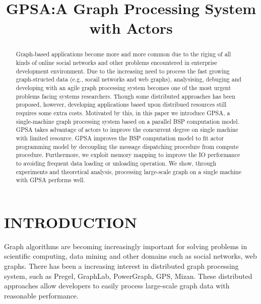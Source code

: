 \documentclass[twocolumn,a4paper,10pt]{article}
\title{GPSA:A Graph Processing System with Actors}
\author{}
\begin{document}
\maketitle
\begin{abstract}
Graph-based applications become more and more common due to the riging of all kinds of online social networks and other problems encountered in enterprise development environment. Due to the increasing need to process the fast growing graph-structed data (e.g., socail networks and web graphs), analysising, debuging and developing with an agile graph processing system becomes one of the most urgent problems facing systems researchers. Though some distributed approaches has been proposed, however, developing applications based upon distribued resources still requires some extra costs. Motivated by this, in this paper we introduce GPSA, a single-machine graph processing system based on a parallel BSP computation model. GPSA takes advantage of actors to improve the concurrent degree on single machine with limited resource. GPSA improves the BSP computation model to fit actor programming model by decoupling the message dispatching procedure from compute procedure. Furthermore, we exploit memory mapping to improve the IO performance to avoiding frequent data loading or unloading operation. We show, through experiments and theoretical analysis, processing large-scale graph on a single machine with GPSA performs well.	
\end{abstract}

\section{INTRODUCTION}
Graph algorithms are becoming increasingly important for solving problems in scientific computing, data mining and other domains such as social networks, web graphs. There has been a increasing interest in distributed graph processing system, such as Pregel, GraphLab, PowerGraph, GPS, Mizan. These distributed approaches allow developers to easily process large-scale graph data with reasonable performance. \newline
\end{document}
